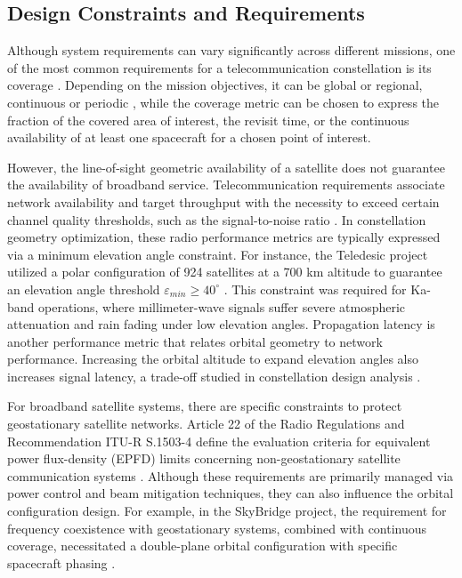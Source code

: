 \subsection{Design Constraints and Requirements}

Although system requirements can vary significantly across different missions, one of the most common requirements for a telecommunication constellation is its coverage \cite{williamsrogers2025}. Depending on the mission objectives, it can be global or regional, continuous or periodic \cite{huang2021, williamsrogers2025}, while the coverage metric can be chosen to express the fraction of the covered area of interest, the revisit time, or the continuous availability of at least one spacecraft for a chosen point of interest\cite{williamsrogers2025, wertz2001ocdm}.

However, the line-of-sight geometric availability of a satellite does not guarantee the availability of broadband service. Telecommunication requirements associate network availability and target throughput with the necessity to exceed certain channel quality thresholds, such as the signal-to-noise ratio \cite{lansard1998tradeoffs,palmade1998skybridge}. In constellation geometry optimization, these radio performance metrics are typically expressed via a minimum elevation angle constraint. For instance, the Teledesic project utilized a polar configuration of 924 satellites at a 700 km altitude to guarantee an elevation angle threshold $\varepsilon_{min} \ge 40^\circ$ \cite{sturza1997teledesic}. This constraint was required for Ka-band operations, where millimeter-wave signals suffer severe atmospheric attenuation and rain fading under low elevation angles. Propagation latency is another performance metric that relates orbital geometry to network performance. Increasing the orbital altitude to expand elevation angles also increases signal latency, a trade-off studied in constellation design analysis \cite{delportillo2019}.


For broadband satellite systems, there are specific constraints to protect geostationary satellite networks. Article 22 of the Radio Regulations and Recommendation ITU-R S.1503-4 define the evaluation criteria for equivalent power flux-density (EPFD) limits concerning non-geostationary satellite communication systems \cite{ituRR2024, ituS1503_4}. Although these requirements are primarily managed via power control and beam mitigation techniques, they can also influence the orbital configuration design. For example, in the SkyBridge project, the requirement for frequency coexistence with geostationary systems, combined with continuous coverage, necessitated a double-plane orbital configuration with specific spacecraft phasing \cite{palmade1998skybridge}.

